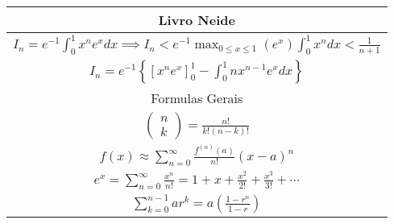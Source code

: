 \documentclass{article}
\begin{document}
\begin{tabularx}{.5\textwidth}{c}
\toprule
Livro Neide\\
\midrule
$ I_n = e^{-1} \displaystyle \int_0^1 x^n e^x dx \implies I_n < e^{-1} \max_{0\leq x \leq 1}(e^x) \displaystyle \int_0^1 x^n dx < \frac{1}{n+1} $\\
$ I_n = e^{-1} \left\{ \displaystyle \left[x^n e^x \right]_0^1 - \displaystyle \int_0^1 n x^{n-1} e^x dx \right\} $\\
\midrule
Formulas Gerais\\
\midrule
$ 
\left( \begin{array}{c}
n\\
k
\end{array}
\right) = \frac{n!}{k!(n-k)!}$\\
$ f(x) \approx \displaystyle \sum_{n=0}^{\infty} \frac{f^{(n)}(a)}{n!}(x-a)^n $\\
$ e^{x} = \sum^{\infty}_{n=0} \frac{x^n}{n!} = 1 + x + \frac{x^2}{2!} + \frac{x^3}{3!} + \cdots $\\
$ \displaystyle \sum_{k=0}^{n-1} ar^k= a \left(\frac{1-r^{n}}{1-r}\right) $\\
\bottomrule
\end{tabularx}
\end{document}

